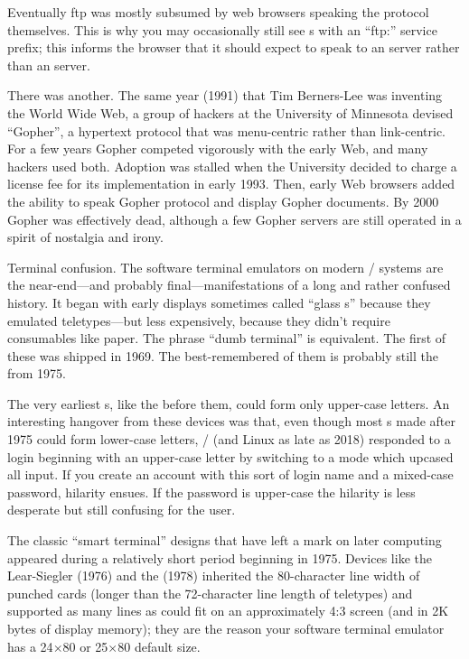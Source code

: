 Eventually ftp was mostly subsumed by web browsers speaking the  protocol
themselves. This is why you may occasionally still see s with an ``ftp:''
service prefix; this informs the browser that it should expect to speak to an
 server rather than an  server.

There was another. The same year (1991) that Tim Berners-Lee was inventing the
World Wide Web, a group of hackers at the University of Minnesota devised
``Gopher'', a hypertext protocol that was menu-centric rather than link-centric.
For a few years Gopher competed vigorously with the early Web, and many hackers
used both. Adoption was stalled when the University decided to charge a license
fee for its implementation in early 1993. Then, early Web browsers added the
ability to speak Gopher protocol and display Gopher documents. By 2000 Gopher
was effectively dead, although a few Gopher servers are still operated in a
spirit of nostalgia and irony.

\sect Terminal confusion.
The software terminal emulators on modern \UNIX/ systems are the near-end---and
probably final---manifestations of a long and rather confused history. It began
with early displays sometimes called ``glass s'' because they emulated
teletypes---but less expensively, because they didn't require consumables like
paper. The phrase ``dumb terminal'' is equivalent. The first of these was shipped
in 1969. The best-remembered of them is probably still the  from 1975.

The very earliest s, like the  before them, could form only upper-case
letters. An interesting hangover from these devices was that, even though most
s made after 1975 could form lower-case letters, \UNIX/ (and Linux as late as
2018) responded to a login beginning with an upper-case letter by switching to
a mode which upcased all input. If you create an account with this sort of
login name and a mixed-case password, hilarity ensues. If the password is
upper-case the hilarity is less desperate but still confusing for the user.

The classic ``smart terminal''  designs that have left a mark on later
computing appeared during a relatively short period beginning in 1975. Devices
like the Lear-Siegler  (1976) and the  (1978) inherited the
80-character line width of punched cards (longer than the 72-character line
length of teletypes) and supported as many lines as could fit on an
approximately 4:3 screen (and in 2K bytes of display memory); they are the
reason your software terminal emulator has a 24$\times$80 or 25$\times$80 default size.

